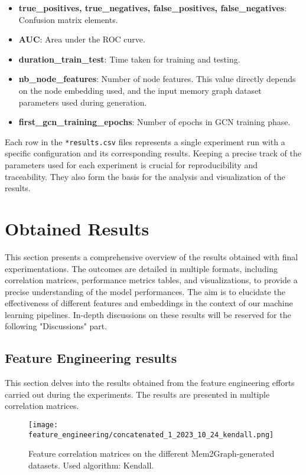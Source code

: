 \begin{itemize}
    \item \textbf{true\_positives, true\_negatives, false\_positives, false\_negatives}: Confusion matrix elements.
    \item \textbf{AUC}: Area under the ROC curve.
    \item \textbf{duration\_train\_test}: Time taken for training and testing.
    \item \textbf{nb\_node\_features}: Number of node features. This value directly depends on the node embedding used, and the input memory graph dataset parameters used during generation.
    \item \textbf{first\_gcn\_training\_epochs}: Number of epochs in GCN training phase.
\end{itemize}

Each row in the \texttt{*results.csv} files represents a single experiment run with a specific configuration and its corresponding results. Keeping a precise track of the parameters used for each experiment is crucial for reproducibility and traceability. They also form the basis for the analysis and visualization of the results.

\section{Obtained Results}

This section presents a comprehensive overview of the results obtained with final experimentations. The outcomes are detailed in multiple formats, including correlation matrices, performance metrics tables, and visualizations, to provide a precise understanding of the model performances. The aim is to elucidate the effectiveness of different features and embeddings in the context of our machine learning pipelines. In-depth discussions on these results will be reserved for the following "Discussions" part.

\subsection{Feature Engineering results}

This section delves into the results obtained from the feature engineering efforts carried out during the experiments. The results are presented in multiple correlation matrices.

\begin{figure}[H]\label{results:corr_matrices:kendall}
    \centering
    \texttt{[image: feature\_engineering/concatenated\_1\_2023\_10\_24\_kendall.png]}
    \caption{Feature correlation matrices on the different Mem2Graph-generated datasets. Used algorithm: Kendall.}
\end{figure}

